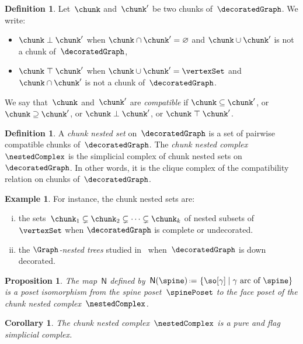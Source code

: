 \documentclass{amsart}
\newtheorem{corollary}[theorem]{Corollary}
\newtheorem{proposition}[theorem]{Proposition}
\theoremstyle{definition}
\newtheorem{definition}[theorem]{Definition}
\newtheorem{example}[theorem]{Example}
\newcommand{\set}[2]{\left\{ #1 \;\middle|\; #2 \right\}} %
\newcommand{\eqdef}{\mbox{\,\raisebox{0.2ex}{\scriptsize\ensuremath{\mathrm:}}\ensuremath{=}\,}} %
\newcommand{\darkblue}{\color{darkblue}} %
\newcommand{\defn}[1]{\textsl{\darkblue #1}} %
\newcommand{\negDisjoint}{\perp} %
\newcommand{\posDisjoint}{\;\top\;} %
\newcommand{\spineToNested}{\mathsf{N}} %
\begin{document}
\begin{definition}
  \label{def:compatibleBlocks}
  Let~$\chunk$ and~$\chunk'$ be two chunks of~$\decoratedGraph$.
  We write:
  \begin{itemize}
    \item $\chunk \negDisjoint \chunk'$ when $\chunk \cap \chunk' = \varnothing$ and $\chunk \cup \chunk'$ is not a chunk of~$\decoratedGraph$,
    \item $\chunk \posDisjoint \chunk'$ when $\chunk \cup \chunk' = \vertexSet$ and~$\chunk \cap \chunk'$ is not a chunk of~$\decoratedGraph$.
  \end{itemize}
  We say that~$\chunk$ and~$\chunk'$ are \defn{compatible} if $\chunk \subseteq \chunk'$, or $\chunk \supseteq \chunk'$, or $\chunk \negDisjoint \chunk'$, or $\chunk \posDisjoint \chunk'$.
\end{definition}

\begin{definition}
  \label{def:nestedComplex}
  A \defn{chunk nested set} on~$\decoratedGraph$ is a set of pairwise compatible chunks of~$\decoratedGraph$.
  The \defn{chunk nested complex}~$\nestedComplex$ is the simplicial complex of chunk nested sets on~$\decoratedGraph$.
  In other words, it is the clique complex of the compatibility relation on chunks of~$\decoratedGraph$.
\end{definition}

\begin{example}
  \label{exm:nestedComplex}
  For instance, the chunk nested sets are:
  \begin{enumerate}[(i)]
    \item the sets~$\chunk_1 \subsetneq \chunk_2 \subsetneq \dots \subsetneq \chunk_k$ of nested subsets of~$\vertexSet$ when $\decoratedGraph$ is complete or undecorated.
    \item the \defn{$\Graph$-nested trees} studied in~\cite{CarrDevadoss} when~$\decoratedGraph$ is down decorated.
  \end{enumerate}
\end{example}

\begin{proposition}
  \label{}
  The map~$\spineToNested$ defined by~$\spineToNested(\spine) \eqdef \set{\so[\gamma]}{\gamma \text{ arc of } \spine}$ is a poset isomorphism from the spine poset~$\spinePoset$ to the face poset of the chunk nested complex~$\nestedComplex$.
\end{proposition}

\begin{corollary}
  The chunk nested complex~$\nestedComplex$ is a pure and flag simplicial complex.
\end{corollary}
\end{document}
